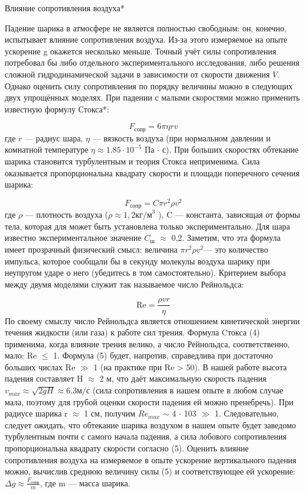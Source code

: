 \documentclass[a4paper, 10pt]{article}%
\begin{document}
Влияние сопротивления воздуха* 



Падение шарика в атмосфере не является полностью свободным: он, конечно, испытывает влияние сопротивления воздуха. Из-за этого измеряемое на опыте ускорение g окажется несколько меньше. Точный учёт силы сопротивления потребовал бы либо отдельного экспериментального исследования, либо решения сложной гидродинамической задачи в зависимости от скорости движения $V$. Однако оценить силу сопротивления по порядку величины можно в следующих двух упрощённых моделях. 
При падении с малыми скоростями можно применить известную формулу Стокса*: 

\[F_{\text{сопр}} = 6 \pi \eta r v\]
где $r$ — радиус шара, $\eta$ — вязкость воздуха (при нормальном давлении и комнатной температуре $\eta \approx 1.85 \cdot 10^{-5}$ Па $\cdot $ с). 
При больших скоростях обтекание шарика становится турбулентным и теория Стокса неприменима. Сила оказывается пропорциональна квадрату скорости и площади поперечного сечения шарика: 

\[F_{\text{сопр}} = C \pi r^2 \rho v^2\]
где $\rho$ — плотность воздуха ($\rho \approx 1,2 \text{кг/м}^3$ ), C — константа, зависящая от формы тела, которая для может быть установлена только экспериментально. Для шара известно экспериментальное значение $C_\text{ш}$ $\approx$ 0,2. Заметим, что  эта формула имеет прозрачный физический смысл: величина $\pi r^2 \rho v^2$— это количество импульса, которое сообщали бы в секунду молекулы воздуха шарику при неупругом ударе о него (убедитесь в том самостоятельно). 
Критерием выбора между двумя моделями служит так называемое число 
Рейнольдса:

\[\text{Re} = \frac{\rho v r}{\eta}\]
По своему смыслу число Рейнольдса является отношением кинетической энергии течения жидкости (или газа) к работе сил трения. Формула Cтокса (4) применима, когда влияние трения велико, а число Рейнольдса, соответственно, мало: Re $\leq$ 1. Формула (5) будет, напротив, справедлива при достаточно больших числах Re $\gg$ 1 (на практике при Re > 50). 
В нашей работе высота падения составляет H $\approx$ 2 м, что даёт максимальную скорость падения $v_{max} \approx \sqrt{2gH} \approx 6.3 \text{м/с}$  (сила сопротивления в нашем опыте в любом случае мала, поэтому для грубой оценки скорости падения ей можно пренебречь). При радиусе шарика r $\approx$ 1 см, получим $Re_{max}$ $\sim$ 4 $\cdot$ 103 $\gg$ 1. Следовательно, следует ожидать, что обтекание шарика воздухом в нашем опыте будет заведомо турбулентным почти с самого начала падения, а сила лобового сопротивления пропорциональна квадрату скорости согласно (5). 
Оценить влияние сопротивления воздуха на измеряемое в опыте ускорение вертикального падения можно, вычислив среднюю величину силы (5) и соответствующее ей ускорение: $\Delta g \approx \frac{F_\text{сопр}}{m}$, где m — масса шарика.
\end{document}
